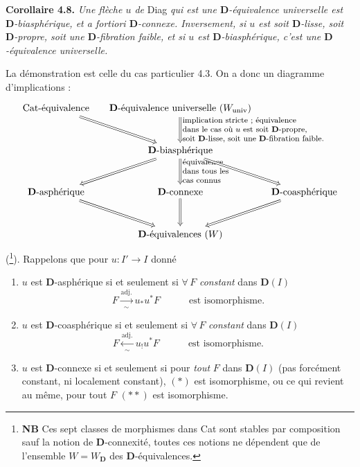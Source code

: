 \documentclass[11pt]{article}
\newcommand{\printedpage}[1]{\marginpar{\footnotesize p.~#1}}
\newcommand{\msp}[1]{\marginpar{\footnotesize [#1]}}
\newcommand{\D}{\mathbf{D}}
\begin{document}
\msp{page 65}

\textbf{Corollaire 4.8.} \textit{Une flèche $u$ de} Diag \textit{qui est une $\D$-équivalence universelle est $\D$-biasphérique, et \textup{a fortiori} $\D$-connexe. Inversement, si $u$ est soit $\D$-lisse, soit $\D$-propre, soit une $\D$-fibration faible, et si $u$ est $\D$-biasphérique, c'est une $\D$-équivalence universelle.}

La démonstration est celle du cas particulier 4.3. On a donc un diagramme d'implications :
\[
\begin{tikzcd}[column sep=small, row sep=large]
\text{Cat-équivalence} \ar[dr, Rightarrow] & \D\text{-équivalence universelle } (W_{\mathrm{univ}}) \ar[d, Rightarrow, "{\text{\footnotesize\begin{tabular}{@{}l@{}}implication stricte ; équivalence\\ dans le cas où $u$ est soit $\mathbf{D}$-propre,\\ soit $\mathbf{D}$-lisse, soit une $\mathbf{D}$-fibration faible.\end{tabular}}}"] & \\
 & \D\text{-biasphérique} \ar[dl, Rightarrow] \ar[d, Rightarrow, "{\text{\footnotesize\begin{tabular}{@{}l@{}}équivalence\\ dans tous les\\ cas connus\end{tabular}}}"] \ar[dr, Rightarrow] & \\
\D\text{-asphérique} \ar[dr, Rightarrow] & \D\text{-connexe} \ar[d, Rightarrow] & \D\text{-coasphérique} \ar[dl, Rightarrow] \\
 & \D\text{-équivalences } (W) &
\end{tikzcd}
\]
(\footnote{\textbf{NB} Ces sept classes de morphismes dans Cat sont stables par composition sauf la notion de $\D$-connexité, toutes ces notions ne dépendent que de l'ensemble $W = W_{\D}$ des $\D$-équivalences.}). Rappelons que pour $u : I' \longrightarrow I$ donné
\begin{enumerate}[leftmargin=*, labelindent=1.5em]
\item[a)] $u$ est $\D$-asphérique si et seulement si $\forall\, F$ \textit{constant} dans $\D(I)$
\[
F \xrightarrow[\sim]{\text{adj.}} u_*u^*F \qquad\quad \text{est isomorphisme.} \tag*{$(\ast)$}
\]
\printedpage{41}
\item[b)] $u$ est $\D$-coasphérique si et seulement si $\forall\, F$ \textit{constant} dans $\D(I)$
\[
F \xleftarrow[\sim]{\text{adj.}} u_!u^*F \qquad\quad \text{est isomorphisme.} \tag*{$(\ast\ast)$}
\]
\item[c)] $u$ est $\D$-connexe si et seulement si pour \textit{tout} $F$ dans $\D(I)$ (pas forcément constant, ni localement constant), $(\ast)$ est isomorphisme, ou ce qui revient au même, pour tout $F$ $(\ast\ast)$ est isomorphisme.
\end{enumerate}
\end{document}

